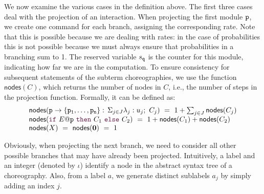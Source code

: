     We now examine the various cases in the definition above. The
    first three cases deal with the projection of an interaction. When
    projecting the first module \( \mathtt{p} \), we create one command
    for each branch, assigning the corresponding rate. Note that this
    is possible because we are dealing with rates: in the case of
    probabilities this is not possible because we must always ensure
    that probabilities in a branching sum to 1. The reserved variable
    \( s_{\mathtt{q}} \) is the counter for this module, indicating how
    far we are in the computation. To ensure consistency for
    subsequent statements of the subterm choreographies, we use the
    function \( \mathsf{nodes}(C) \), which returns the number of
    nodes in \( C \), i.e., the number of steps in the projection
    function. Formally, it can be defined as: 
    \begin{displaymath}
      \begin{array}{llll}
        \mathsf{nodes}(\interact{p}{\role p_1,\ldots,\role p_n})\ =\ 1+\sum_{j\in J}\mathsf{nodes}(C_j)\\
        \mathsf{nodes}(\ifTE {E}{p}{C_1}{C_2})\ =\ 1+\mathsf{nodes}(C_1)+\mathsf{nodes}(C_2)\\
        \mathsf{nodes}(X)\ =\ 
        \mathsf{nodes}(\CEnd)\ =\ 1
      \end{array}
    \end{displaymath}

    Obviously, when projecting the next branch, we need to consider
    all other possible branches that may have already been
    projected. Intuitively, a label and an integer (denoted by
    \( \iota \)) identify a node in the abstract syntax tree of a
    choreography. Also, from a label \( a \), we generate distinct
    sublabels \( a_j \) by simply adding an index \( j \).

